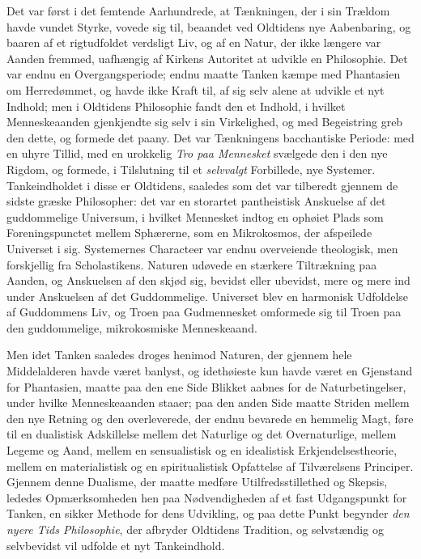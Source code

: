 \documentclass[12pt,a4paper]{book}
\newcommand{\opage}[1]{\marginnote{\footnotesize\textit{[#1]}}}
\begin{document}
Det var først i det femtende Aarhundrede, at Tænkningen, der i sin
Trældom havde vundet Styrke, vovede sig til, beaandet ved Oldtidens
nye Aabenbaring, og baaren af et rigtudfoldet verdsligt Liv, og af en
Natur, der ikke længere var Aanden fremmed, uafhængig af Kirkens
Autoritet at udvikle en Philosophie. Det var endnu en
Overgangsperiode; endnu maatte Tanken kæmpe med Phantasien om
Herredømmet, og havde ikke Kraft til, af sig selv alene at udvikle et
nyt Indhold; men i Oldtidens Philosophie fandt den et Indhold, i
hvilket Menneskeaanden gjenkjendte sig selv i sin Virkelighed, og med
Begeistring greb den dette, og formede det paany. Det var Tænkningens
bacchantiske Periode: med en uhyre Tillid, med en urokkelig \emph{Tro
paa Mennesket} svælgede den i den nye Rigdom, og formede, i Tilslutning
til et \emph{selvvalgt} Forbillede, nye Systemer. Tankeindholdet i
disse er Oldtidens, saaledes som det var
\opage{6} tilberedt gjennem de sidste græske Philosopher: det var en storartet
pantheistisk Anskuelse af det guddommelige Universum, i hvilket
Mennesket indtog en ophøiet Plads som Foreningspunctet mellem
Sphærerne, som en Mikrokosmos, der afspeilede Universet i sig.
Systemernes Characteer var endnu overveiende theologisk, men
forskjellig fra Scholastikens. Naturen udøvede en stærkere Tiltrækning
paa Aanden, og Anskuelsen af den skjød sig, bevidst eller ubevidst,
mere og mere ind under Anskuelsen af det Guddommelige. Universet blev
en harmonisk Udfoldelse af Guddommens Liv, og Troen paa Gudmennesket
omformede sig til Troen paa den guddommelige, mikrokosmiske
Menneskeaand.

Men idet Tanken saaledes droges henimod Naturen, der gjennem hele
Middelalderen havde været banlyst, og idethøieste kun havde været en
Gjenstand for Phantasien, maatte paa den ene Side Blikket aabnes for
de Naturbetingelser, under hvilke Menneskeaanden staaer; paa den anden
Side maatte Striden mellem den nye Retning og den overleverede, der
endnu bevarede en hemmelig Magt, føre til en dualistisk Adskillelse
mellem det Naturlige og det Overnaturlige, mellem Legeme og Aand,
mellem en sensualistisk og en idealistisk Erkjendelsestheorie, mellem
en materialistisk og en spiritualistisk Opfattelse af Tilværelsens
Principer. Gjennem denne Dualisme, der maatte medføre
Utilfredsstillethed og Skepsis, lededes Opmærksomheden hen paa
Nødvendigheden af et fast Udgangspunkt for Tanken, en sikker Methode
for dens Udvikling, og paa dette Punkt begynder \emph{den nyere Tids
Philosophie}, der afbryder Oldtidens Tradition, og selvstændig og
selvbevidst vil udfolde et nyt Tankeindhold.
\end{document}
